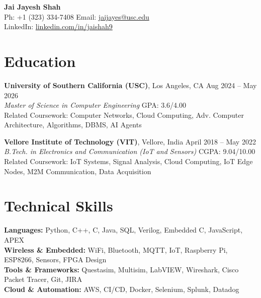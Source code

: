 \documentclass[letterpaper,10pt]{article}
\begin{document}
\begin{center}
    {\LARGE \textbf{Jai Jayesh Shah}} \\
    \vspace{5pt}
    \small
    Ph: +1 (323) 334-7408 \quad Email: \href{mailto:jaijayes@usc.edu}{jaijayes@usc.edu} \\
    LinkedIn: \href{https://www.linkedin.com/in/jaishah9}{linkedin.com/in/jaishah9} \\
    \vspace{-8pt}
\end{center}

\section*{Education}
\textbf{University of Southern California (USC)}, Los Angeles, CA \hfill Aug 2024 -- May 2026 \\
\textit{Master of Science in Computer Engineering} \hfill GPA: 3.6/4.00 \\
Related Coursework: Computer Networks, Cloud Computing, Adv. Computer Architecture, Algorithms, DBMS, AI Agents

\vspace{2pt}

\textbf{Vellore Institute of Technology (VIT)}, Vellore, India \hfill April 2018 -- May 2022 \\
\textit{B.Tech. in Electronics and Communication (IoT and Sensors)} \hfill CGPA: 9.04/10.00 \\
Related Coursework: IoT Systems, Signal Analysis, Cloud Computing, IoT Edge Nodes, M2M Communication, Data Acquisition

\section*{Technical Skills}
\textbf{Languages:} Python, C++, C, Java, SQL, Verilog, Embedded C, JavaScript, APEX \\
\textbf{Wireless \& Embedded:} WiFi, Bluetooth, MQTT, IoT, Raspberry Pi, ESP8266, Sensors, FPGA Design \\
\textbf{Tools \& Frameworks:} Questasim, Multisim, LabVIEW, Wireshark, Cisco Packet Tracer, Git, JIRA \\
\textbf{Cloud \& Automation:} AWS, CI/CD, Docker, Selenium, Splunk, Datadog

\end{document}
